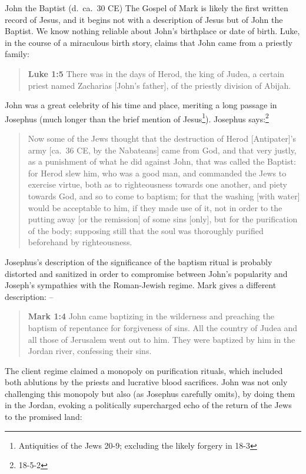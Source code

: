 \documentclass[8pt]{article}
\newcommand{\quotesize}{\large{}}
\newenvironment{quotetext}{\begin{quote}\quotesize}{\end{quote}}
\newcommand{\bible}[2]{\begin{quotetext}\textbf{#1} #2\end{quotetext}}
\newcommand{\gospelmark}[2]{\bible{Mark #1}{#2}}
\newcommand{\luke}[2]{\bible{Luke #1}{#2}}
\begin{document}
\begin{section}{John the Baptist (d.~ca.~30 CE)}
The Gospel of Mark is likely the first written record of Jesus, and it begins not with a description of Jesus but of John the Baptist.
We know nothing reliable about John's birthplace or date of birth. Luke, in the course of a miraculous birth story, claims that
John came from a priestly family:

\luke{1:5}{There was in the days of Herod, the king of Judea, a certain priest named Zacharias [John's father], of the priestly division of Abijah.}

John was a great celebrity of his time and place, meriting a long passage in
Josephus (much longer than the brief mention of Jesus\footnote{Antiquities of the Jews 20-9;
excluding the likely forgery in 18-3}).
Josephus says:\footnote{18-5-2} %

\begin{quotetext}
Now some of the Jews thought that the destruction of Herod [Antipater]'s army [ca.~36 CE, by the Nabateans] came
from God, and that very justly, as a punishment of what he did against
John, that was called the Baptist: for Herod slew him, who was a good
man, and commanded the Jews to exercise virtue, both as to
righteousness towards one another, and piety towards God, and so to
come to baptism; for that the washing [with water] would be acceptable
to him, if they made use of it, not in order to the putting away [or
the remission] of some sins [only], but for the purification of the
body; supposing still that the soul was thoroughly purified beforehand
by righteousness.
\end{quotetext}

Josephus's description of the significance of the baptism ritual is probably
distorted and sanitized in order to compromise between John's popularity and Joseph's sympathies
with the Roman-Jewish regime. Mark gives a different description: --

\gospelmark{1:4}{John came baptizing in the wilderness and preaching the
baptism of repentance for forgiveness of sins.  All the country of
Judea and all those of Jerusalem went out to him. They were baptized
by him in the Jordan river, confessing their sins.}

The client regime claimed a monopoly on purification rituals,
which included both ablutions by the priests and lucrative blood sacrifices.
John was not only challenging this monopoly but also (as Josephus carefully omits), by doing them in the
Jordan, evoking a politically supercharged echo of the return of the Jews to the promised land:


\end{section}
\end{document}
